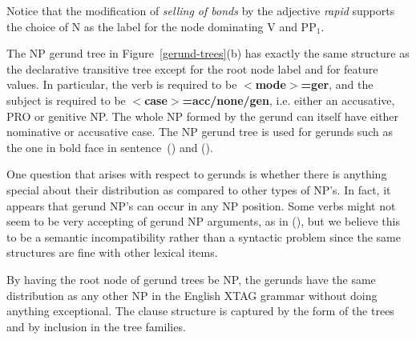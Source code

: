 Notice that the modification of {\it selling of bonds} by the adjective {\it
rapid} supports the choice of N as the label for the node dominating V and
PP$_{1}$.

The NP gerund tree in Figure~\ref{gerund-trees}(b) has exactly the same
structure as the declarative transitive tree except for the root node label and
for feature values.  In particular, the verb is required to be {\bf
$<$mode$>$=ger}, and the subject is required to be {\bf
$<$case$>$=acc/none/gen}, i.e. either an accusative, PRO or genitive NP. The
whole NP formed by the gerund can itself have either nominative or accusative
case. The NP gerund tree is used for gerunds such as the one in bold face in
sentence~() and ().

One question that arises with respect to gerunds is whether there is anything
special about their distribution as compared to other types of NP's.  In fact,
it appears that gerund NP's can occur in any NP position.  Some verbs might not
seem to be very accepting of gerund NP arguments, as in (), but we
believe this to be a semantic incompatibility rather than a syntactic problem
since the same structures are fine with other lexical items.


By having the root node of gerund trees be NP, the gerunds have the
same distribution as any other NP in the English XTAG grammar without
doing anything exceptional. The clause structure is captured by the
form of the trees and by inclusion in the tree families.
